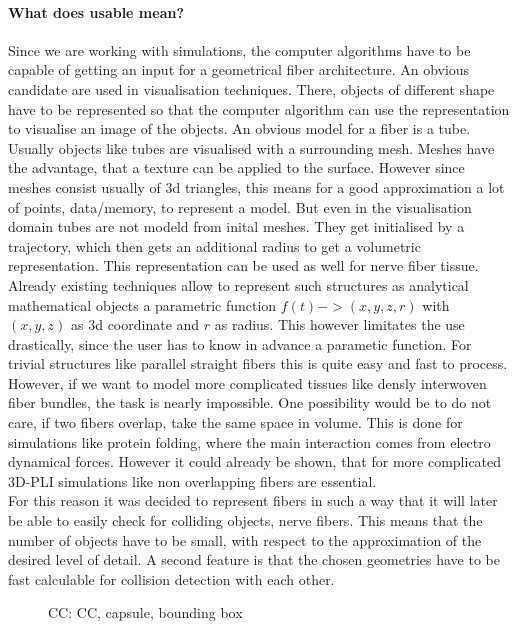 \paragraph{What does usable mean?}
Since we are working with simulations, the computer algorithms have to be capable of getting an input for a geometrical fiber architecture.
An obvious candidate are used in visualisation techniques.
There, objects of different shape have to be represented so that the computer algorithm can use the representation to visualise an image of the objects.
An obvious model for a fiber is a tube.
Usually objects like tubes are visualised with a surrounding mesh.
Meshes have the advantage, that a texture can be applied to the surface.
However since meshes consist usually of 3d triangles, this means for a good approximation a lot of points, \ie data/memory, to represent a model.
But even in the visualisation domain tubes are not modeld from inital meshes.
They get initialised by a trajectory, which then gets an additional radius to get a volumetric representation.
This representation can be used as well for nerve fiber tissue.
\\
% 
Already existing techniques \dummy allow to represent such structures as analytical mathematical objects \eg a parametric function $f(t) -> (x,y,z,r)$ with $(x,y,z)$ as 3d coordinate and $r$ as radius.
This however limitates the use drastically, since the user has to know in advance a parametic function.
For trivial structures like parallel straight fibers this is quite easy and fast to process.
However, if we want to model more complicated tissues like densly interwoven fiber bundles, the task is nearly impossible.
One possibility would be to do not care, if two fibers overlap, \ie take the same space in volume.
This is done \eg for simulations like protein folding, where the main interaction comes from electro dynamical forces.
However it could already be shown, that for more complicated \ac{3D-PLI} simulations like \dummy non overlapping fibers are essential.
\\
% 
For this reason it was decided to represent fibers in such a way that it will later be able to easily check for colliding objects, \ie nerve fibers.
This means that the number of objects have to be small, with respect to the approximation of the desired level of detail.
A second feature is that the chosen geometries have to be fast calculable for collision detection with each other.
\\
% 
\begin{figure}[!t]
    \centering
    \setlength{\tikzwidth}{0.75\textwidth}
    \tikzset{external/export=false}
	\caption[cc and co]{\Acf{CC}:  \ac{CC},  capsule,  bounding box}
	\label{fig:conical_capsule}
\end{figure}
